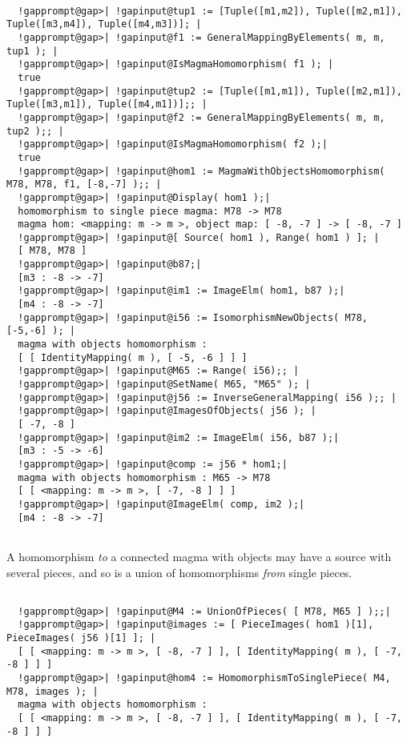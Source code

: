 \documentclass[a4paper,11pt]{report}
\begin{document}
{{{ }

 
\begin{Verbatim}[commandchars=!@|,fontsize=\small,frame=single,label=Example]
  
  !gapprompt@gap>| !gapinput@tup1 := [Tuple([m1,m2]), Tuple([m2,m1]), Tuple([m3,m4]), Tuple([m4,m3])]; |
  !gapprompt@gap>| !gapinput@f1 := GeneralMappingByElements( m, m, tup1 ); |
  !gapprompt@gap>| !gapinput@IsMagmaHomomorphism( f1 ); |
  true
  !gapprompt@gap>| !gapinput@tup2 := [Tuple([m1,m1]), Tuple([m2,m1]), Tuple([m3,m1]), Tuple([m4,m1])];; |
  !gapprompt@gap>| !gapinput@f2 := GeneralMappingByElements( m, m, tup2 );; |
  !gapprompt@gap>| !gapinput@IsMagmaHomomorphism( f2 );|
  true 
  !gapprompt@gap>| !gapinput@hom1 := MagmaWithObjectsHomomorphism( M78, M78, f1, [-8,-7] );; |
  !gapprompt@gap>| !gapinput@Display( hom1 );|
  homomorphism to single piece magma: M78 -> M78
  magma hom: <mapping: m -> m >, object map: [ -8, -7 ] -> [ -8, -7 ]
  !gapprompt@gap>| !gapinput@[ Source( hom1 ), Range( hom1 ) ]; |
  [ M78, M78 ]
  !gapprompt@gap>| !gapinput@b87;|
  [m3 : -8 -> -7]
  !gapprompt@gap>| !gapinput@im1 := ImageElm( hom1, b87 );|
  [m4 : -8 -> -7]
  !gapprompt@gap>| !gapinput@i56 := IsomorphismNewObjects( M78, [-5,-6] ); |
  magma with objects homomorphism : 
  [ [ IdentityMapping( m ), [ -5, -6 ] ] ]
  !gapprompt@gap>| !gapinput@M65 := Range( i56);; |
  !gapprompt@gap>| !gapinput@SetName( M65, "M65" ); |
  !gapprompt@gap>| !gapinput@j56 := InverseGeneralMapping( i56 );; |
  !gapprompt@gap>| !gapinput@ImagesOfObjects( j56 ); |
  [ -7, -8 ]
  !gapprompt@gap>| !gapinput@im2 := ImageElm( i56, b87 );|
  [m3 : -5 -> -6]
  !gapprompt@gap>| !gapinput@comp := j56 * hom1;|
  magma with objects homomorphism : M65 -> M78
  [ [ <mapping: m -> m >, [ -7, -8 ] ] ]
  !gapprompt@gap>| !gapinput@ImageElm( comp, im2 );|
  [m4 : -8 -> -7]
  
\end{Verbatim}
 A homomorphism \emph{to} a connected magma with objects may have a source with several pieces, and so
is a union of homomorphisms \emph{from} single pieces. 

 
\begin{Verbatim}[commandchars=!@|,fontsize=\small,frame=single,label=Example]
  
  !gapprompt@gap>| !gapinput@M4 := UnionOfPieces( [ M78, M65 ] );;|
  !gapprompt@gap>| !gapinput@images := [ PieceImages( hom1 )[1], PieceImages( j56 )[1] ]; |
  [ [ <mapping: m -> m >, [ -8, -7 ] ], [ IdentityMapping( m ), [ -7, -8 ] ] ]
  !gapprompt@gap>| !gapinput@hom4 := HomomorphismToSinglePiece( M4, M78, images ); |
  magma with objects homomorphism : 
  [ [ <mapping: m -> m >, [ -8, -7 ] ], [ IdentityMapping( m ), [ -7, -8 ] ] ]
  

\end{Verbatim}}}
\end{document}
